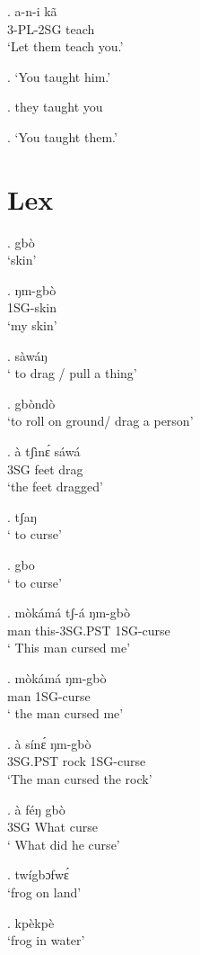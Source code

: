\documentclass{assets/fieldnotes}
\begin{document}
\exg. a-n-i kã \\
3-PL-2SG teach \\
`Let them teach you.'

\ex. `You taught him.'

\ex. they taught you

\ex. `You taught them.'


\section{Lex}

\ex. gbò\\
`skin'

\ex. ŋm-gbò \\
1SG-skin\\
`my skin'

\ex. sàwáŋ\\
` to drag / pull a thing'

\ex. gbòndò\\
`to roll on ground/ drag a person'

\exg. à tʃìnɛ́ sáwá \\ 
 3SG feet drag \\
`the feet dragged'

\ex. tʃaŋ\\
` to curse'

\ex. gbo\\
` to curse'

\exg. mòkámá tʃ-á ŋm-gbò \\
 man  this-3SG.PST 1SG-curse\\
` This man cursed me'

\exg. mòkámá  ŋm-gbò \\
man  1SG-curse \\
` the man cursed me'

\exg. à sínɛ́ ŋm-gbò \\
3SG.PST rock 1SG-curse\\
`The man cursed the rock'

\exg. à féŋ gbò\\
3SG What curse\\
` What did he curse'


\ex. twígbɔfwɛ́\\
`frog on land'

\ex. kpèkpè\\
`frog in water'
\end{document}
